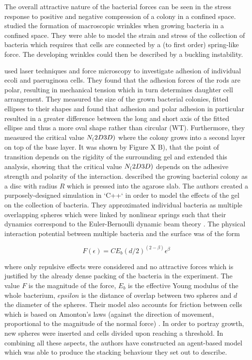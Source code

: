 \documentclass{article}
\begin{document}
The overall attractive nature of the bacterial forces can be seen in the stress response to positive and negative compression of a colony in a confined space.
\cite{Trejo2013} studied the formation of macroscopic wrinkles when growing bacteria in a confined space.
They were able to model the strain and stress of the collection of bacteria which requires that cells are connected by a (to first order) spring-like force.
The developing wrinkles could then be described by a buckling instability.

\cite{Duvernoy2018} used laser techniques and force microscopy to investigate adhesion of individual \ac{ecoli} and \ac{paeruginosa} cells.
They found that the adhesion forces of the rods are polar, resulting in mechanical tension which in turn determines daughter cell arrangement.
They measured the size of the grown bacterial colonies, fitted ellipses to their shapes and found that adhesion and polar adhesion in particular resulted in a greater difference between the long and short axis of the fitted ellipse and thus a more oval shape rather than circular (WT).
Furthermore, they measured the critical value $N_(2D\/3D)$ where the colony grows into a second layer on top of the base layer.
It was shown by \cite{Grant2014} Figure X B), that the point of transition depends on the rigidity of the surrounding gel and \cite{Duvernoy2018} extended this analysis, showing that the critical value $N_(2D\/3D)$ depends on the adhesive strength and polarity of the interaction.
\cite{Grant2014} described the growing bacterial colony as a disc with radius $R$ which is pressed into the agarose slab.
The authors created a purposely-designed simulation in `C++` in order to model the effects of the gel on the collection of bacteria.
They approximated individual bacteria as multiple overlapping spheres which were linked by nonlinear springs such that their dynamics correspond to the Euler-Bernoulli dynamic beam theory \cite{HAN1999}.
The physical interaction potential between multiple bacteria and the surface was of the form

\begin{equation}
    F(\epsilon) = C E_b (d/2)^(2 - \beta) \epsilon^\beta
\end{equation}

where only repulsive effects were considered and no attractive forces which is justified by the already dense packing of the bacteria in the experiment.
The value $F$ is the magnitude of the force, $E_b$ is the effective Young modulus of the whole bacterium, $epsilon$ is the distance of overlap between two spheres and $d$ the diameter of the spheres.
Their model also accounts for friction between cells which is based on Amonton's laws (against the direction of movement, proportional to the magnitude of the normal force) \cite{Hutchings2021}.
In order to portray growth, new spheres were inserted and cells divided upon reaching a threshold.
In combining all these aspects, the authors have constructed an agent-based model which was able to produce the stacking behaviour they set out to describe.
\end{document}
